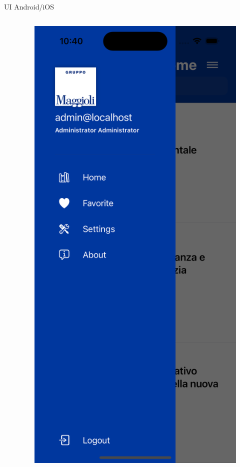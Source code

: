 \begin{frame}{UI Android/iOS}
\begin{columns}[onlytextwidth]
\begin{column}{0.14\textwidth}
        \end{column}
        \begin{column}{0.14\textwidth}
        
            \begin{figure}[H]
                \includegraphics[width=1\textwidth]{img/sidenav_ios.png}
            \end{figure}
            

\end{column}
\end{columns}
\end{frame}
